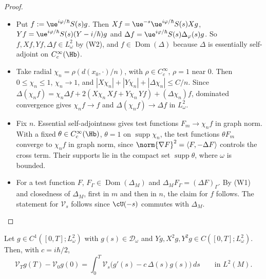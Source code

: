 \begin{proof}
\begin{itemize}
\item Put $f:=\ue^{i\varphi/\hbar}S(s)g$. Then $Xf=\ue^{-s}\ue^{i\varphi/\hbar}S(s)Xg$, $Yf=\ue^{i\varphi/\hbar}S(s)(Y-i/\hbar)g$ and $\Delta f=\ue^{i\varphi/\hbar}S(s)\Delta_\varphi(s)g$. So $f,Xf,Yf,\Delta f\in L^2_\omega$ by (W2), and $f\in\operatorname{Dom}(\Delta)$ because $\Delta$ is essentially self-adjoint on $C_c^\infty(\Hb)$.
\item Take radial $\chi_n=\rho(d(x_0,\cdot)/n)$, with $\rho\in C_c^\infty$, $\rho=1$ near $0$. Then $0\le\chi_n\le1$, $\chi_n\to1$, and $|X\chi_n|+|Y\chi_n|+|\Delta\chi_n|\le C/n$. Since $\Delta(\chi_nf)=\chi_n\Delta f+2(X\chi_n\,Xf+Y\chi_n\,Yf)+(\Delta\chi_n)f$, dominated convergence gives $\chi_nf\to f$ and $\Delta(\chi_nf)\to\Delta f$ in $L^2_\omega$.
\item Fix $n$. Essential self-adjointness gives test functions $F_m\to\chi_nf$ in graph norm. With a fixed $\theta\in C_c^\infty(\Hb)$, $\theta=1$ on $\operatorname{supp}\chi_n$, the test functions $\theta F_m$ converge to $\chi_nf$ in graph norm, since $\norm{\nabla F}^2=\langle F,-\Delta F\rangle$ controls the cross term. Their supports lie in the compact set $\operatorname{supp}\theta$, where $\omega$ is bounded.
\item For a test function $F$, $F_\Gamma\in\operatorname{Dom}(\Delta_M)$ and $\Delta_MF_\Gamma=(\Delta F)_\Gamma$. By (W1) and closedness of $\Delta_M$, first in $m$ and then in $n$, the claim for $f$ follows. The statement for $\mathcal V_s$ follows since $\cU(-s)$ commutes with $\Delta_M$.\qedhere
\end{itemize}
\end{proof}

\begin{lemma}[Duhamel on $M$]\label{lem:surf-duh}
Let $g\in C^1([0,T];L^2_\omega)$ with $g(s)\in\mathcal D_\omega$ and $Yg,X^2g,Y^2g\in C([0,T];L^2_\omega)$. Then, with $c=i\hbar/2$,
\[
\mathcal V_Tg(T)-\mathcal V_0g(0)=\int_0^T\mathcal V_s\bigl(g'(s)-c\,\Delta(s)g(s)\bigr)\,ds\qquad\text{in }L^2(M).
\]
\end{lemma}

